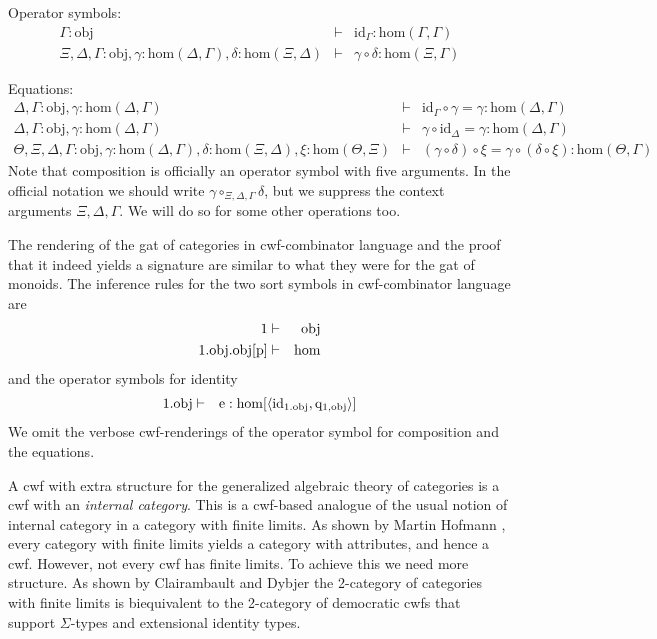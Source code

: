 \documentclass{lmcs}
\def\Obj{\mathrm{obj}}
\def\Ctx{\mathrm{Ctx}}
\def\Hom{\mathrm{hom}}
\def\id{\mathrm{id}}
\def\idmon{\mathrm{e}}
\begin{document}
Operator symbols:
\begin{eqnarray*}
\Gamma : \Obj &\vdash& \id_\Gamma : \Hom(\Gamma,\Gamma)\\
\Xi,\Delta,\Gamma : \Obj, \gamma : \Hom(\Delta,\Gamma), \delta : \Hom(\Xi,\Delta) &\vdash&
\gamma \circ \delta : \Hom(\Xi,\Gamma)
\end{eqnarray*}

Equations:
\begin{eqnarray*}
\Delta, \Gamma : \Obj, \gamma : \Hom(\Delta,\Gamma) &\vdash& \id_\Gamma \circ \gamma = \gamma : \Hom(\Delta,\Gamma)\\
\Delta, \Gamma : \Obj, \gamma : \Hom(\Delta,\Gamma) &\vdash& \gamma \circ \id_\Delta = \gamma : \Hom(\Delta,\Gamma)\\
\Theta, \Xi,\Delta,\Gamma : \Obj, \gamma : \Hom(\Delta,\Gamma), \delta : \Hom(\Xi,\Delta), \xi : \Hom(\Theta,\Xi) &\vdash&
(\gamma \circ \delta) \circ \xi = \gamma \circ (\delta \circ \xi): \Hom(\Theta,\Gamma)
\end{eqnarray*}
Note that composition is officially an operator symbol with five arguments. In the official notation we should write $\gamma \circ_{\Xi,\Delta,\Gamma} \delta$, but we suppress the context arguments $\Xi,\Delta,\Gamma$. We will do so for some other operations too.

The rendering of the gat of categories in cwf-combinator language and the proof that it indeed yields a signature are similar to what they were for the gat of monoids. The inference rules for the two sort symbols in cwf-combinator language are
\begin{eqnarray*}
1 &\vdash& \Obj\\
1.\Obj.\Obj[\p] &\vdash& \Hom
\end{eqnarray*}
and the operator symbols for identity
\begin{eqnarray*}
1.\Obj &\vdash& \idmon : \Hom[\tuple{\id_{1.\Obj},\q_{1,\Obj}}]
\end{eqnarray*}
We omit the verbose cwf-renderings of the operator symbol for composition and the equations.

A cwf with extra structure for the generalized algebraic theory of categories is a cwf with an {\em internal category}. This is a cwf-based analogue of the usual notion of internal category in a category with finite limits. As shown by Martin Hofmann \cite{hofmann:csl,hofmann:cambridge}, every category with finite limits yields a category with attributes, and hence a cwf. However, not every cwf has finite limits. To achieve this we need more structure. As shown by Clairambault and Dybjer \cite{ClairambaultD11,ClairambaultD14} the 2-category of categories with finite limits is biequivalent to the 2-category of democratic cwfs that support $\Sigma$-types and extensional identity types.
\end{document}
